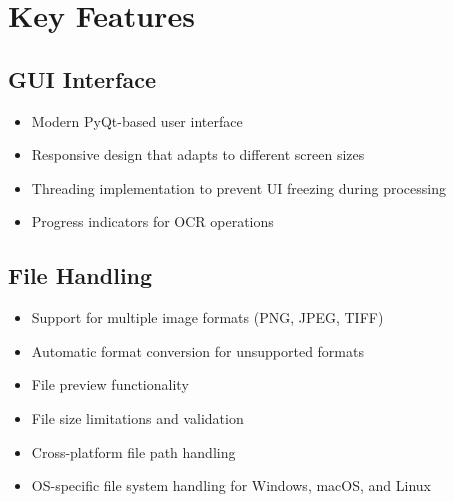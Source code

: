 \documentclass[12pt]{article}
\begin{document}
\section{Key Features}

\subsection{GUI Interface}
\begin{itemize}
    \item Modern PyQt-based user interface
    \item Responsive design that adapts to different screen sizes
    \item Threading implementation to prevent UI freezing during processing
    \item Progress indicators for OCR operations
\end{itemize}

\subsection{File Handling}
\begin{itemize}
    \item Support for multiple image formats (PNG, JPEG, TIFF)
    \item Automatic format conversion for unsupported formats
    \item File preview functionality
    \item File size limitations and validation
    \item Cross-platform file path handling
    \item OS-specific file system handling for Windows, macOS, and Linux
\end{itemize}
\end{document}
